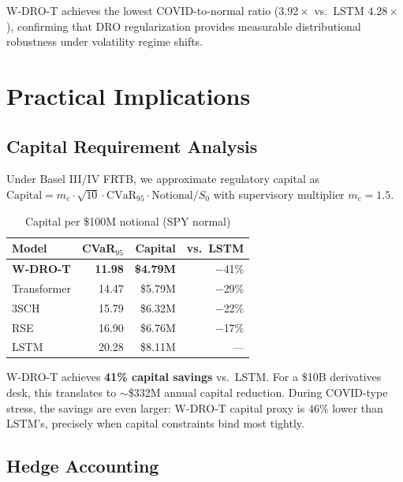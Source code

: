 \documentclass[11pt]{article}
\begin{document}
W-DRO-T achieves the lowest COVID-to-normal ratio ($3.92\times$ vs.\ LSTM $4.28\times$), confirming that DRO regularization provides measurable distributional robustness under volatility regime shifts.

\section{Practical Implications}
\label{sec:implications}

\subsection{Capital Requirement Analysis}

Under Basel III/IV FRTB, we approximate regulatory capital as $\mathrm{Capital} = m_c \cdot \sqrt{10} \cdot \mathrm{CVaR}_{95} \cdot \mathrm{Notional} / S_0$ with supervisory multiplier $m_c = 1.5$.

\begin{table}[t]
\centering
\caption{Capital per \$100M notional (SPY normal)}
\label{tab:capital}
\small
\begin{tabular}{lrrr}
\toprule
\textbf{Model} & \textbf{CVaR$_{95}$} & \textbf{Capital} & \textbf{vs.\ LSTM} \\
\midrule
\textbf{W-DRO-T} & \textbf{11.98} & \textbf{\$4.79M} & $-$41\% \\
Transformer & 14.47 & \$5.79M & $-$29\% \\
3SCH & 15.79 & \$6.32M & $-$22\% \\
RSE & 16.90 & \$6.76M & $-$17\% \\
LSTM & 20.28 & \$8.11M & --- \\
\bottomrule
\end{tabular}
\end{table}

W-DRO-T achieves \textbf{41\% capital savings} vs.\ LSTM. For a \$10B derivatives desk, this translates to $\sim$\$332M annual capital reduction. During COVID-type stress, the savings are even larger: W-DRO-T capital proxy is 46\% lower than LSTM's, precisely when capital constraints bind most tightly.

\subsection{Hedge Accounting}
\end{document}

